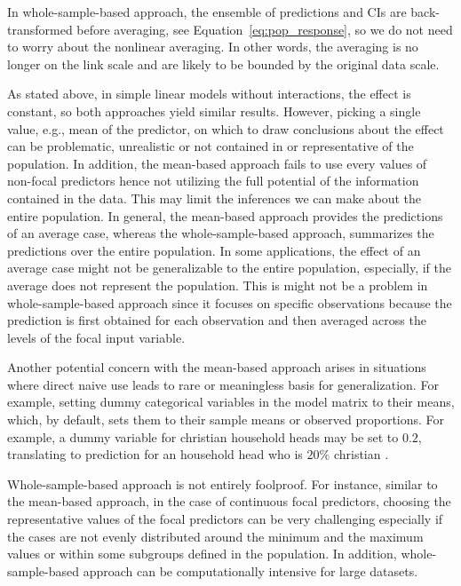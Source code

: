 In whole-sample-based approach, the ensemble of predictions and CIs are back-transformed before averaging, see Equation~\ref{eq:pop_response}, so we do not need to worry about the nonlinear averaging. In other words, the averaging is no longer on the link scale and are likely to be bounded by the original data scale.

 As stated above, in simple linear models without interactions, the effect is constant, so both approaches yield similar results. 
However, picking a single value, e.g., mean of the predictor, on which to draw conclusions about the effect can be problematic, unrealistic or not contained in or representative of the population. In addition, the mean-based approach fails to use every values of non-focal predictors hence not utilizing the full potential of the information contained in the data. This may limit the inferences we can make about the entire population. In general, the mean-based approach provides the predictions of an average case, whereas the whole-sample-based approach, summarizes the predictions over the entire population. In some applications, the effect of an average case might not be generalizable to the entire population, especially, if the average does not represent the population. This is might not be a problem in whole-sample-based approach since it focuses on specific observations because the prediction is first obtained for each observation and then averaged across the levels of the focal input variable.

Another potential concern with the mean-based approach arises in situations where direct naive use leads to rare or meaningless basis for generalization. For example, setting dummy categorical variables in the model matrix to their means, which, by default, sets them to their sample means or observed proportions. For example, a dummy variable for christian household heads may be set to $0.2$, translating to prediction for an household head who is $20\%$ christian \citep{hanmer2013behind}.

Whole-sample-based approach is not entirely foolproof. For instance, similar to the mean-based approach, in the case of continuous focal predictors, choosing the representative values of the focal predictors can be very challenging especially if the cases are not evenly distributed around the minimum and the maximum values or within some subgroups defined in the population. In addition, whole-sample-based approach can be computationally intensive for large datasets.

